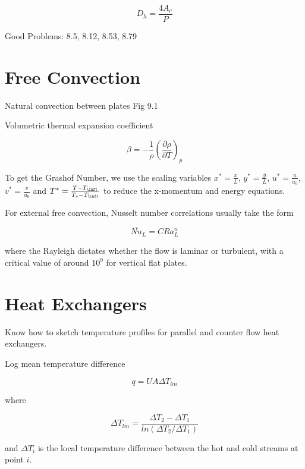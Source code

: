\documentclass[paper=letter, fontsize=11pt]{scrartcl}
\numberwithin{equation}{section}        %
\numberwithin{figure}{section}          %
\numberwithin{table}{section}               %
\begin{document}
\begin{equation}
D_h = \frac{4A_c}{P}
\end{equation}

\bigskip Good Problems: 8.5, 8.12, 8.53, 8.79


\section{Free Convection}

Natural convection between plates Fig 9.1

Volumetric thermal expansion coefficient 

\begin{equation}
\beta = -\frac{1}{\rho}\left(\frac{\partial\rho}{\partial T}\right)_p
\end{equation}

To get the Grashof Number, we use the scaling variables $x^\ast = \frac{x}{L}$, $y^\ast = \frac{y}{L}$, $u^\ast = \frac{u}{u_0}$, $v^\ast = \frac{v}{u_0}$ and $T^\ast = \frac{T-T_\inft}{T_s-T_\inft}$ to reduce the x-momentum and energy equations.

For external free convection, Nusselt number correlations usually take the form

\begin{equation}
\overline{Nu}_L = C Ra_L^n
\end{equation}

\noindent where the Rayleigh dictates whether the flow is laminar or turbulent, with a critical value of around $10^9$ for vertical flat plates.
    

\section{Heat Exchangers}

Know how to sketch temperature profiles for parallel and counter flow heat exchangers.

Log mean temperature difference 

\begin{equation}
q = UA\Delta T_{lm}
\end{equation}

\noindent where

\begin{equation}
\Delta T_{lm} = \frac{\Delta T_2 - \Delta T_1}{ln(\Delta T_2 / \Delta T_1)}
\end{equation}

\noindent and $\Delta T_i$ is the local temperature difference between the hot and cold streams at point $i$.
\end{document}

